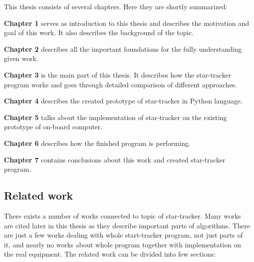 \documentclass[12pt,a4paper,oneside]{article}
\begin{document}
This thesis consists of several chapters. Here they are shortly summarized:\par
\setlength{\parindent}{0cm}
\textbf{Chapter 1} serves as introduction to this thesis and describes the motivation and goal of this work. It also describes the background of the topic.\par
\textbf{Chapter 2} describes all the important foundations for the fully understanding given work.\par
\textbf{Chapter 3} is the main part of this thesis. It describes how the star-tracker program works and goes through detailed comparison of different approaches.\par
\textbf{Chapter 4} describes the created prototype of star-tracker in Python language.\par
\textbf{Chapter 5} talks about the implementation of star-tracker on the existing prototype of on-board computer.\par
\textbf{Chapter 6} describes how the finished program is performing.\par
\textbf{Chapter 7} contains conclusions about this work and created star-tracker program.\par

\setlength{\parindent}{1cm}

\subsection{Related work}

There exists a number of works connected to topic of star-tracker. Many works are cited later in this thesis as they describe important parts of algorithms. There are just a few works dealing with whole start-tracker program, not just parts of it, and nearly no works about whole program together with implementation on the real equipment. The related work can be divided into few sections:
\end{document}
